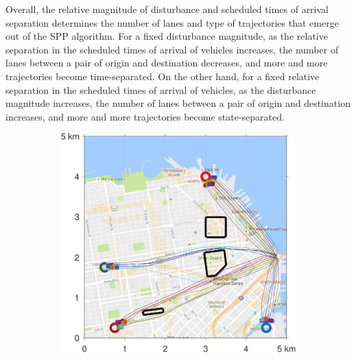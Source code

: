 Overall, the relative magnitude of disturbance and scheduled times of arrival separation determines the number of lanes and type of trajectories that emerge out of the SPP algorithm. For a fixed disturbance magnitude, as the relative separation in the scheduled times of arrival of vehicles increases, the number of lanes between a pair of origin and destination decreases, and more and more trajectories become time-separated. On the other hand, for a fixed relative separation in the scheduled times of arrival of vehicles, as the disturbance magnitude increases, the number of lanes between a pair of origin and destination increases, and more and more trajectories become state-separated.
%
\begin{figure}[!htb]
 \centering
\begin{subfigure}{0.5\textwidth}
  \includegraphics[width=\columnwidth]{figs/sf_d6sep0}
  \label{fig:sf_d6sep0}
\end{subfigure}%
\begin{subfigure}{0.5\textwidth}

\end{subfigure}
\end{figure}
